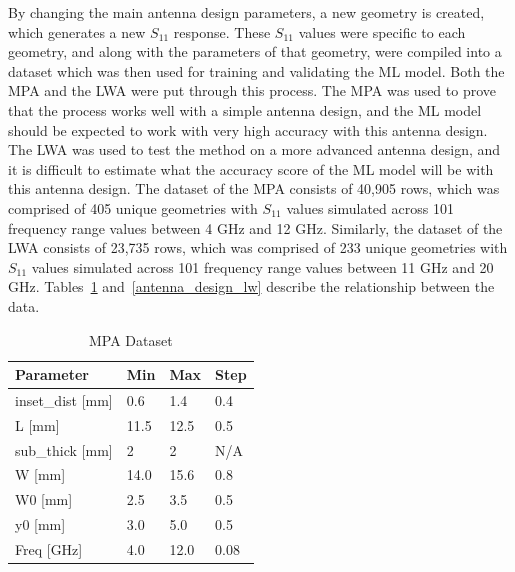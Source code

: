\documentclass[conference]{IEEEtran}
\begin{document}
By changing the main antenna design parameters, a new geometry is created, which generates a new $S_{11}$ response. These $S_{11}$ values were specific to each geometry, and along with the parameters of that geometry, were compiled into a dataset which was then used for training and validating the ML model. Both the MPA and the LWA were put through this process. The MPA was used to prove that the process works well with a simple antenna design, and the ML model should be expected to work with very high accuracy with this antenna design. The LWA was used to test the method on a more advanced antenna design, and it is difficult to estimate what the accuracy score of the ML model will be with this antenna design. The dataset of the MPA consists of 40,905 rows, which was comprised of 405 unique geometries with $S_{11}$ values simulated across 101 frequency range values between 4 GHz and 12 GHz. Similarly, the dataset of the LWA consists of 23,735 rows, which was comprised of 233 unique geometries with $S_{11}$ values simulated across 101 frequency range values between 11 GHz and 20 GHz. Tables~\ref{antenna_dataset_p} and~\ref{antenna_design_lw} describe the relationship between the data.

\begin{table}[h]
\caption{MPA Dataset}
\begin{center}
\begin{tabular}{ |l|l|l|l| }
    \hline
    Parameter & Min & Max & Step \\ 
    \hline
    inset\_dist [mm] & 0.6 & 1.4 & 0.4 \\
    \hline
    L [mm] & 11.5 & 12.5 & 0.5 \\
    \hline
    sub\_thick [mm] & 2 & 2 & N/A \\
    \hline
    W [mm] & 14.0 & 15.6 & 0.8 \\
    \hline
    W0 [mm] & 2.5 & 3.5 & 0.5 \\
    \hline
    y0 [mm] & 3.0 & 5.0 & 0.5 \\
    \hline
    Freq [GHz] & 4.0 & 12.0 & 0.08 \\
    \hline
\end{tabular}
\end{center}
\label{antenna_dataset_p}
\end{table}
\end{document}
